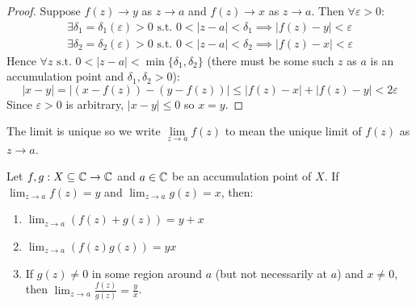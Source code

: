 \documentclass[../main.tex]{subfiles}
\begin{document}
\begin{proof}
  Suppose $f(z) \to y$ as $z \to a$ and $f(z) \to x$ as $z \to a$.
  Then $\forall \varepsilon > 0$:
  \begin{align*}
    \exists \delta_1 = \delta_1(\varepsilon) > 0 \text{ s.t. } 0 < |z - a| < \delta_1 \implies |f(z) - y| < \varepsilon \\
    \exists \delta_2 = \delta_2(\varepsilon) > 0 \text{ s.t. } 0 < |z - a| < \delta_2 \implies |f(z) - x| < \varepsilon
  \end{align*}
  Hence $\forall z \text{ s.t. } 0 < |z - a| < \min\{\delta_1, \delta_2\}$ (there must be some such $z$ as $a$ is an accumulation point and $\delta_1, \delta_2 > 0$):
  \[
    |x - y| = |(x - f(z)) - (y - f(z))| \leq |f(z) - x| + |f(z) - y| < 2\varepsilon
  \]
  Since $\varepsilon > 0$ is arbitrary, $|x - y| \leq 0$ so $x = y$.
\end{proof}
\begin{remark}
  The limit is unique so we write $\lim\limits_{z \to a} f(z)$ to mean the unique limit of $f(z)$ as $z \to a$.
\end{remark}
\begin{lemma}
  Let $f, g: X \subseteq \mathbb{C} \to \mathbb{C}$ and $a \in \mathbb{C}$ be an accumulation point of $X$.
  If $\lim_{z \to a} f(z) = y$ and $\lim_{z \to a} g(z) = x$, then:
  \label{limitLaws}
  \begin{enumerate}
    \item $\lim_{z \to a} (f(z) + g(z)) = y + x$
    \item $\lim_{z \to a} (f(z)g(z)) = yx$
    \item If $g(z) \neq 0$ in some region around $a$ (but not necessarily at $a$) and $x \neq 0$, then $\lim_{z \to a} \frac{f(z)}{g(z)} = \frac{y}{x}$.
  \end{enumerate}
\end{lemma}
\end{document}
